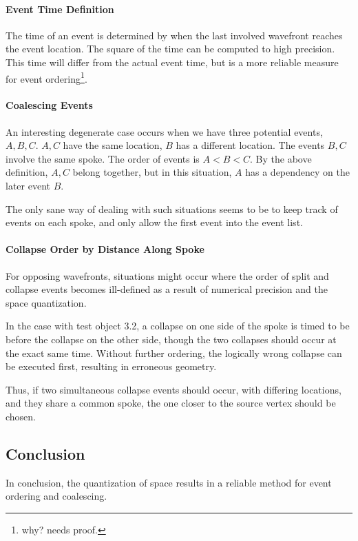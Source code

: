 \documentclass[12pt,a4paper,oneside,openany]{article}
\begin{document}
\paragraph{Event Time Definition}

The time of an event is determined by when the last involved wavefront reaches the event location. The square of the time can be computed to high precision. This time will differ from the actual event time, but is a more reliable measure for event ordering\footnote{why? needs proof.}.

\paragraph{Coalescing Events}

An interesting degenerate case occurs when we have three potential events, $A,B,C$. $A,C$ have the same location, $B$ has a different location. The events $B,C$ involve the same spoke. The order of events is $A < B < C$. By the above definition, $A,C$ belong together, but in this situation, $A$ has a dependency on the later event $B$.

The only sane way of dealing with such situations seems to be to keep track of events on each spoke, and only allow the first event into the event list.

\paragraph{Collapse Order by Distance Along Spoke}

For opposing wavefronts, situations might occur where the order of split and collapse events becomes ill-defined as a result of numerical precision and the space quantization.

In the case with test object 3.2, a collapse on one side of the spoke is timed to be before the collapse on the other side, though the two collapses should occur at the exact same time. Without further ordering, the logically wrong collapse can be executed first, resulting in erroneous geometry.

Thus, if two simultaneous collapse events should occur, with differing locations, and they share a common spoke, the one closer to the source vertex should be chosen.

\subsection{Conclusion}

In conclusion, the quantization of space results in a reliable method for event ordering and coalescing.


\nocite{*}



\end{document}
